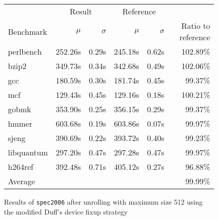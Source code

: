 \begin{figure}[th]
    \begin{center}
        \begin{tabular}{lrrrrr}
            \toprule
            & \multicolumn{2}{c}{Result} & \multicolumn{2}{c}{Reference}\\
            Benchmark & $\mu$ & $\sigma$ & $\mu$ & $\sigma$ & Ratio to reference\\
            \midrule
            perlbench & 252.26s & 0.29s & 245.18s & 0.62s & 102.89\%\\
            bzip2 & 349.73s & 0.34s & 342.68s & 0.49s & 102.06\%\\
            gcc & 180.59s & 0.30s & 181.74s & 0.45s & 99.37\%\\
            mcf & 129.43s & 0.45s & 129.16s & 0.18s & 100.21\%\\
            gobmk & 353.90s & 0.25s & 356.15s & 0.29s & 99.37\%\\
            hmmer & 603.68s & 0.19s & 603.86s & 0.07s & 99.97\%\\
            sjeng & 390.69s & 0.22s & 393.72s & 0.40s & 99.23\%\\
            libquantum & 297.20s & 0.47s & 297.28s & 0.47s & 99.97\%\\
            h264ref & 392.48s & 0.71s & 405.12s & 0.27s & 96.88\%\\
            \midrule
            Average & & & & & 99.99\%\\
            \bottomrule
        \end{tabular}
    \end{center}
    \caption{Results of \texttt{spec2006} after unrolling with maximum size 512 using the modified Duff's device fixup strategy}
    \label{fig:eval:perf:duff:512}
\end{figure}
